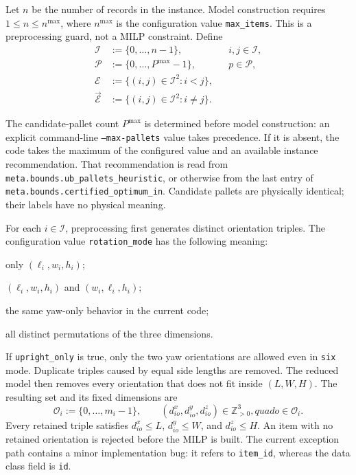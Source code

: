 \documentclass[11pt]{article}
\newcommand{\Items}{\mathcal I}
\newcommand{\Pallets}{\mathcal P}
\newcommand{\Orients}{\mathcal O}
\newcommand{\Pairs}{\mathcal E}
\newcommand{\OPairs}{\overrightarrow{\mathcal E}}
\newcommand{\Z}{\mathbb Z}
\begin{document}
Let $n$ be the number of records in the instance.  Model construction requires
$1\le n\le n^{\max}$, where $n^{\max}$ is the configuration value
\texttt{max\_items}.  This is a preprocessing guard, not a MILP constraint.
Define
\begin{align}
 \Items&:=\{0,\ldots,n-1\}, && i,j\in\Items,\label{eq:items}\\
 \Pallets&:=\{0,\ldots,P^{\max}-1\}, && p\in\Pallets,\label{eq:pallets}\\
 \Pairs&:=\{(i,j)\in\Items^2:i<j\},\label{eq:pairs}\\
 \OPairs&:=\{(i,j)\in\Items^2:i\ne j\}.\label{eq:ordered-pairs}
\end{align}

The candidate-pallet count $P^{\max}$ is determined before model construction:
an explicit command-line \texttt{--max-pallets} value takes precedence.  If it
is absent, the code takes the maximum of the configured value and an available
instance recommendation.  That recommendation is read from
\texttt{meta.bounds.ub\_pallets\_heuristic}, or otherwise from the last entry
of \texttt{meta.bounds.certified\_optimum\_in}.  Candidate pallets are
physically identical; their labels have no physical meaning.

For each $i\in\Items$, preprocessing first generates distinct orientation
triples.  The configuration value \texttt{rotation\_mode} has the following
meaning:
\begin{description}[leftmargin=2.8cm,style=nextline]
 \item[\texttt{none}] only $(\ell_i,w_i,h_i)$;
 \item[\texttt{yaw}] $(\ell_i,w_i,h_i)$ and $(w_i,\ell_i,h_i)$;
 \item[\texttt{metadata}] the same yaw-only behavior in the current code;
 \item[\texttt{six}] all distinct permutations of the three dimensions.
\end{description}
If \texttt{upright\_only} is true, only the two yaw orientations are allowed
even in \texttt{six} mode.  Duplicate triples caused by equal side lengths are
removed.  The reduced model then removes every orientation that does not fit
inside $(L,W,H)$.  The resulting set and its fixed dimensions are
\begin{equation}
 \Orients_i:=\{0,\ldots,m_i-1\},\qquad
 (d^x_{io},d^y_{io},d^z_{io})\in\Z_{>0}^3,quad o\in\Orients_i.
 \label{eq:orientations}
\end{equation}
Every retained triple satisfies $d^x_{io}\le L$, $d^y_{io}\le W$, and
$d^z_{io}\le H$.  An item with no retained orientation is rejected before the
MILP is built.  The current exception path contains a minor implementation bug:
it refers to \texttt{item\_id}, whereas the data class field is \texttt{id}.
\end{document}
